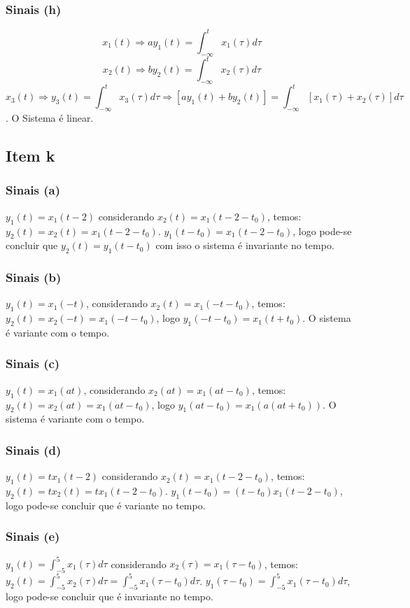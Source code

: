 \documentclass[a4paper, 12pt]{article}
\begin{document}
            \subsubsection{Sinais (h)}
            \[ x_{1}(t) \Rightarrow ay_{1}(t) = \int_{-\infty}^{t}x_{1}(\tau)d\tau\]
            \[ x_{2}(t) \Rightarrow by_{2}(t) = \int_{-\infty}^{t}x_{2}(\tau)d\tau\]
            \[ x_{3}(t) \Rightarrow y_{3}(t) = \int_{-\infty}^{t}x_{3}(\tau)d\tau \Rightarrow [ay_{1}(t) + by_{2}(t) ] =  \int_{-\infty}^{t}[x_{1}(\tau) + x_{2}(\tau)]d\tau\ \]. O Sistema é linear.
        \subsection{Item k}
            \subsubsection{Sinais (a)}
            $y_{1}(t) = x_{1}(t-2) $ considerando $x_{2}(t) = x_{1}(t-2-t_{0})$, temos: $y_{2}(t) = x_{2}(t) = x_{1}(t-2-t_{0})$. $y_{1}(t-t_{0}) =  x_{1}(t-2-t_{0})$, logo pode-se concluir que $y_{2}(t) = y_{1}(t-t_{0})$ com isso o sistema é invariante no tempo.

            \subsubsection{Sinais (b)}
            $y_{1}(t) = x_{1}(-t)$, considerando $x_{2}(t) = x_{1}(-t-t_{0})$, temos: $y_{2}(t) = x_{2}(-t) = x_{1}(-t-t_{0})$, logo $y_{1}(-t-t_{0}) = x_{1}(t+t_{0})$. O sistema é variante com o tempo.
            \subsubsection{Sinais (c)}
            $y_{1}(t) = x_{1}(at)$, considerando $x_{2}(at) = x_{1}(at-t_{0})$, temos: $y_{2}(t) = x_{2}(at) = x_{1}(at-t_{0})$, logo $y_{1}(at-t_{0}) = x_{1}(a(at+t_{0}))$. O sistema é variante com o tempo.
            \subsubsection{Sinais (d)}
            $y_{1}(t) = tx_{1}(t-2) $ considerando $x_{2}(t) = x_{1}(t-2-t_{0})$, temos: $y_{2}(t) = tx_{2}(t) = tx_{1}(t-2-t_{0})$. $y_{1}(t-t_{0}) =  (t-t_{0})x_{1}(t-2-t_{0})$, logo pode-se concluir que é variante no tempo.
            \subsubsection{Sinais (e)}
            $y_{1}(t) = \int_{-5}^{5}x_{1}(\tau)d\tau $ considerando $x_{2}(\tau) = x_{1}(\tau-t_{0})$, temos: $y_{2}(t) = \int_{-5}^{5}x_{2}(\tau)d\tau = \int_{-5}^{5}x_{1}(\tau-t_{0})d\tau$. $y_{1}(\tau-t_{0}) =  \int_{-5}^{5}x_{1}(\tau - t_{0})d\tau$, logo pode-se concluir que é invariante no tempo.
\end{document}
